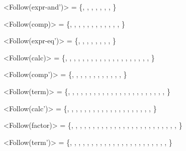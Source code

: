 <Follow(expr-and')>       = \{\lit{||}, \lit{=}, \lit{\{}, \lit{)}, \lit{;}, \lit{,}, , \}

<Follow(comp)>            = \{\lit{==}, \lit{!=}, , , \lit{\&\&}, \lit{||}, \lit{=}, \lit{\{}, \lit{)}, \lit{;}, \lit{,}, , \}

<Follow(expr-eq')>        = \{\lit{\&\&}, \lit{||}, \lit{=}, \lit{\{}, \lit{)}, \lit{;}, \lit{,}, , \}

<Follow(calc)>            = \{\lit{>}, \lit{\textless}, \lit{\textless=}, \lit{>=}, , , , , \lit{==}, \lit{!=}, , , \lit{\&\&}, \lit{||}, \lit{=}, \lit{\{}, \lit{)}, \lit{;}, \lit{,}, , \}

<Follow(comp')>           = \{\lit{==}, \lit{!=}, , , \lit{\&\&}, \lit{||}, \lit{=}, \lit{\{}, \lit{)}, \lit{;}, \lit{,}, , \}

<Follow(term)>            = \{\lit{+}, \lit{-}, , \lit{>}, \lit{\textless}, \lit{\textless=}, \lit{>=}, , , , , \lit{==}, \lit{!=}, , , \lit{\&\&}, \lit{||}, \lit{=}, \lit{\{}, \lit{)}, \lit{;}, \lit{,}, , \}

<Follow(calc')>           = \{\lit{>}, \lit{\textless}, \lit{\textless=}, \lit{>=}, , , , , \lit{==}, \lit{!=}, , , \lit{\&\&}, \lit{||}, \lit{=}, \lit{\{}, \lit{)}, \lit{;}, \lit{,}, , \}

<Follow(factor)>          = \{\lit{*}, \lit{/}, \lit{+}, \lit{-}, , \lit{>}, \lit{\textless}, \lit{\textless=}, \lit{>=}, , , , , \lit{==}, \lit{!=}, , , \lit{\&\&}, \lit{||}, \lit{=}, \lit{\{}, \lit{)}, \lit{;}, \lit{,}, , \}

<Follow(term')>           = \{\lit{+}, \lit{-}, , \lit{>}, \lit{\textless}, \lit{\textless=}, \lit{>=}, , , , , \lit{==}, \lit{!=}, , , \lit{\&\&}, \lit{||}, \lit{=}, \lit{\{}, \lit{)}, \lit{;}, \lit{,}, , \}
